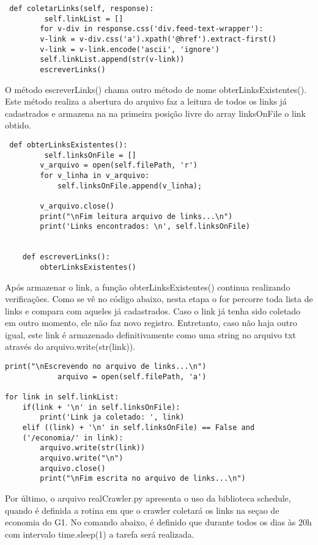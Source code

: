 \documentclass[12pt]{article}
\begin{document}
    \begin{lstlisting}
 def coletarLinks(self, response):
         self.linkList = []
        for v-div in response.css('div.feed-text-wrapper'):
        v-link = v-div.css('a').xpath('@href').extract-first()
        v-link = v-link.encode('ascii', 'ignore')
        self.linkList.append(str(v-link))
        escreverLinks()
    \end{lstlisting}

            
O método escreverLinks() chama outro método de nome obterLinksExistentes(). Este método realiza a abertura do arquivo faz a leitura de todos os links já cadastrados e armazena na na primeira posição livre do array linksOnFile o link obtido.
 

    \begin{lstlisting}
 def obterLinksExistentes():
         self.linksOnFile = []
        v_arquivo = open(self.filePath, 'r')
        for v_linha in v_arquivo:
            self.linksOnFile.append(v_linha);
        
        v_arquivo.close()
        print("\nFim leitura arquivo de links...\n")
        print('Links encontrados: \n', self.linksOnFile)
        
        
    def escreverLinks():
        obterLinksExistentes()
    \end{lstlisting}


Após armazenar o link, a função obterLinksExistentes() continua realizando verificações. Como se vê no código abaixo, nesta etapa o for percorre toda lista de links e compara com aqueles já cadastrados. Caso o link já tenha sido coletado em outro momento, ele não faz novo registro. Entretanto, caso não haja outro igual, este link é armazenado definitivamente como uma string no arquivo txt através do arquivo.write(str(link)). 

    \begin{lstlisting}
print("\nEscrevendo no arquivo de links...\n")
            arquivo = open(self.filePath, 'a')
        
for link in self.linkList:
    if(link + '\n' in self.linksOnFile):
        print('Link ja coletado: ', link)
    elif ((link) + '\n' in self.linksOnFile) == False and 
    ('/economia/' in link):
        arquivo.write(str(link))
        arquivo.write("\n")
        arquivo.close()
        print("\nFim escrita no arquivo de links...\n")
    \end{lstlisting}
 
 Por último, o arquivo realCrawler.py apresenta o uso da biblioteca schedule, quando é definida a rotina em que o crawler coletará os links na seçao de economia do G1. No comando abaixo, é definido que durante todos os dias às 20h com intervalo time.sleep(1) a tarefa será realizada.
 
\end{document}
